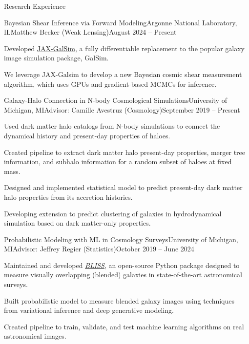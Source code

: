 \documentclass{resume} %
\begin{document}
\begin{rSection}{Research Experience}

\begin{rSubsection}{Bayesian Shear Inference via Forward Modeling}{Argonne National Laboratory, IL}{Matthew Becker (Weak Lensing)}{August 2024 -- Present}
\item Developed \href{https://github.com/GalSim-developers/JAX-GalSim}{JAX-GalSim}, a fully differentiable replacement to the popular galaxy image simulation package, GalSim. 
\item We leverage JAX-Galsim to develop a new Bayesian cosmic shear measurement algorithm, which uses GPUs and gradient-based MCMCs for inference.
\end{rSubsection}

\begin{rSubsection}{Galaxy-Halo Connection in N-body Cosmological Simulations}{University of Michigan, MI}{Advisor: Camille Avestruz (Cosmology)}{September 2019 -- Present}
\item Used dark matter halo catalogs from N-body simulations to connect the dynamical history and present-day properties of haloes.
\item Created pipeline to extract dark matter halo present-day properties, merger tree information, and subhalo information for a random subset of haloes at fixed mass.
\item Designed and implemented statistical model to predict present-day dark matter halo properties from its accretion histories.
\item Developing extension to predict clustering of galaxies in hydrodynamical simulation based on dark matter-only properties. 
\end{rSubsection}

\begin{rSubsection}{Probabilistic Modeling with ML in Cosmology Surveys}{University of Michigan, MI}{Advisor: Jeffrey Regier (Statistics)}{October 2019 -- June 2024}
\item Maintained and developed \textit{\href{https://github.com/prob-ml/bliss}{BLISS}}, an open-source Python package designed to measure visually overlapping (blended) galaxies in state-of-the-art astronomical surveys.
\item Built probabilistic model to measure blended galaxy images using techniques from variational inference and deep generative modeling.
\item Created pipeline to train, validate, and test machine learning algorithms on real astronomical images.
\end{rSubsection}


\end{rSection}
\end{document}
